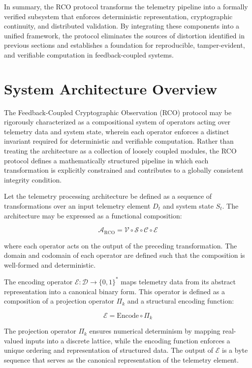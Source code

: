 In summary, the RCO protocol transforms the telemetry pipeline into a formally verified subsystem that enforces deterministic representation, cryptographic continuity, and distributed validation. By integrating these components into a unified framework, the protocol eliminates the sources of distortion identified in previous sections and establishes a foundation for reproducible, tamper-evident, and verifiable computation in feedback-coupled systems.

\section{System Architecture Overview}

The Feedback-Coupled Cryptographic Observation (RCO) protocol may be rigorously characterized as a compositional system of operators acting over telemetry data and system state, wherein each operator enforces a distinct invariant required for deterministic and verifiable computation. Rather than treating the architecture as a collection of loosely coupled modules, the RCO protocol defines a mathematically structured pipeline in which each transformation is explicitly constrained and contributes to a globally consistent integrity condition.

Let the telemetry processing architecture be defined as a sequence of transformations over an input telemetry element $D_t$ and system state $S_t$. The architecture may be expressed as a functional composition:

\begin{equation}
\mathcal{A}_{\text{RCO}} = \mathcal{V} \circ \mathcal{S} \circ \mathcal{C} \circ \mathcal{E}
\end{equation}

where each operator acts on the output of the preceding transformation. The domain and codomain of each operator are defined such that the composition is well-formed and deterministic.

The encoding operator $\mathcal{E}: \mathcal{D} \rightarrow \{0,1\}^*$ maps telemetry data from its abstract representation into a canonical binary form. This operator is defined as a composition of a projection operator $\Pi_k$ and a structural encoding function:

\begin{equation}
\mathcal{E} = \text{Encode} \circ \Pi_k
\end{equation}

The projection operator $\Pi_k$ ensures numerical determinism by mapping real-valued inputs into a discrete lattice, while the encoding function enforces a unique ordering and representation of structured data. The output of $\mathcal{E}$ is a byte sequence that serves as the canonical representation of the telemetry element.

